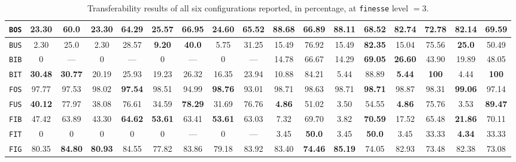 \begin{sidewaystable}
\begin{center}
\begin{tabular}{|c | c c | c c | c c | c c || c c | c c | c c | c c |}
                    \hline
                    \texttt{BOS} & 23.30 & 60.0 & 23.30 & 64.29 & \textbf{25.57} & \textbf{66.95} & 24.60 & 65.52 & \textbf{88.68} & 66.89 & 88.11 & 68.52 & 82.74 & \textbf{72.78} & 82.14 & 69.59 \\
                    \hline
                    \texttt{BUS} & 2.30 & 25.0 & 2.30 & 28.57 & \textbf{9.20} & \textbf{40.0} & 5.75 & 31.25 & 15.49 & 76.92 & 15.49 & \textbf{82.35} & 15.04 & 75.56 & \textbf{25.0} & 50.49 \\
                    \hline
                    \texttt{BIB} & 0 & --- & 0 & --- & 0 & --- & 0 & --- & 14.78 & 66.67 & 14.29 & \textbf{69.05} & \textbf{26.60} & 43.90 & 19.89 & 48.05 \\
                    \hline
                    \texttt{BIT} & \textbf{30.48} & \textbf{30.77} & 20.19 & 25.93 & 19.23 & 26.32 & 16.35 & 23.94 & 10.88 & 84.21 & 5.44 & 88.89 & \textbf{5.44} & \textbf{100} & 4.44 & \textbf{100} \\
                    \hline
                    \texttt{FOS} & 97.77 & 97.53 & 98.02 & \textbf{97.54} & 98.51 & 94.99 & \textbf{98.76} & 93.01 & 98.71 & 98.63 & 98.71 & \textbf{98.71} & 98.87 & 98.31 & \textbf{99.06} & 97.14 \\
                    \hline
                    \texttt{FUS} & \textbf{40.12} & 77.97 & 38.08 & 76.61 & 34.59 & \textbf{78.29} & 31.69 & 76.76 & \textbf{4.86} & 51.02 & 3.50 & 54.55 & \textbf{4.86} & 75.76 & 3.53 & \textbf{89.47} \\
                    \hline
                    \texttt{FIB} & 47.42 & 63.89 & 43.30 & \textbf{64.62} & \textbf{53.61} & 63.41 & \textbf{53.61} & 63.03 & 7.32 & 69.70 & 3.82 & \textbf{70.59} & 17.52 & 65.48 & \textbf{21.86} & 70.11 \\
                    \hline
                    \texttt{FIT} & 0 & 0 & 0 & 0 & 0 & --- & 0 & --- & 3.45 & \textbf{50.0} & 3.45 & \textbf{50.0} & 3.45 & 33.33 & \textbf{4.34} & 33.33 \\
                    \hline
                    \texttt{FIG} & 80.35 & \textbf{84.80} & \textbf{80.93} & 84.55 & 77.82 & 83.86 & 79.18 & 83.92 & 83.40 & \textbf{74.46} & \textbf{85.19} & 74.05 & 82.93 & 73.48 & 82.38 & 73.08 \\
                    \hline
                \end{tabular}
                \caption{
                    \label{tab::transferability_f3}
                    Transferability results of all six configurations reported, in percentage, at \texttt{finesse} level $=3$.
                }
            \end{center}
        \end{sidewaystable}
